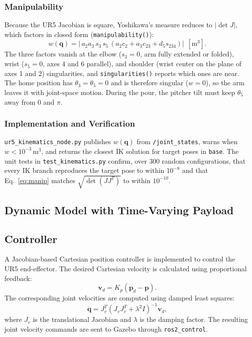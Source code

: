 \documentclass[conference]{IEEEtran}
\begin{document}
\subsubsection{Manipulability}
Because the UR5 Jacobian is square, Yoshikawa's measure reduces to $\lvert\det J\rvert$, which factors 
in closed form (\texttt{manipulability()}):
\begin{equation}
    w(\mathbf q)=\bigl|\,a_2a_3\,s_3\,s_5\,
       (a_2c_2+a_3c_{23}+d_5s_{234})\bigr|\ \ [\text{m}^3].
    \label{eq:manip}
\end{equation}
The three factors vanish at the elbow ($s_3=0$, arm fully extended or folded), wrist ($s_5=0$, axes 
4 and 6 parallel), and shoulder (wrist center on the plane of axes 1 and 2) singularities, and
\texttt{singularities()} reports which ones are near. The home position has 
$\theta_3=\theta_5=0$ and is therefore singular ($w=0$), so the arm leaves it with joint-space 
motion. During the pour, the pitcher tilt must keep $\theta_5$ away from $0$ and $\pi$.

\subsubsection{Implementation and Verification}
\texttt{ur5\_kinematics\_node.py} publishes $w(\mathbf q)$ from \texttt{/joint\_states}, warns when 
$w<10^{-3}$\,m$^3$, and returns the closest IK solution for target poses in \texttt{base}. The unit 
tests in \texttt{test\_kinematics.py} confirm, over 300 random configurations, that every IK branch 
reproduces the target pose to within $10^{-8}$ and that Eq.~\eqref{eq:manip} matches 
$\sqrt{\det(JJ^T)}$ to within $10^{-10}$.

\subsection{Dynamic Model with Time-Varying Payload}

\subsection{Controller}
A Jacobian-based Cartesian position controller
is implemented to control the UR5 end-effector.
The desired Cartesian velocity is calculated
using proportional feedback:
\begin{equation}
    \mathbf{v}_d =
    K_p(\mathbf{p}_d-\mathbf{p}).
\end{equation}
The corresponding joint velocities are computed
using damped least squares:
\begin{equation}
    \dot{\mathbf{q}} =
    J_v^T(J_vJ_v^T+\lambda^2I)^{-1}
    \mathbf{v}_d,
\end{equation}
where $J_v$ is the translational Jacobian and
$\lambda$ is the damping factor. The resulting
joint velocity commands are sent to Gazebo
through \texttt{ros2\_control}.
\end{document}
